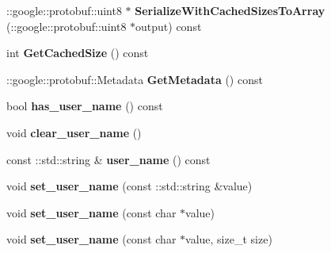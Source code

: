 \begin{DoxyCompactItemize}
\item 
\hypertarget{classSimpleChat_1_1ChatTarget_a571dabbabfa13682a417763cf8295430}{\-::google\-::protobuf\-::uint8 $\ast$ {\bfseries Serialize\-With\-Cached\-Sizes\-To\-Array} (\-::google\-::protobuf\-::uint8 $\ast$output) const }\label{classSimpleChat_1_1ChatTarget_a571dabbabfa13682a417763cf8295430}

\item 
\hypertarget{classSimpleChat_1_1ChatTarget_ae7f5a171f96de9e6f48a5d066160b3af}{int {\bfseries Get\-Cached\-Size} () const }\label{classSimpleChat_1_1ChatTarget_ae7f5a171f96de9e6f48a5d066160b3af}

\item 
\hypertarget{classSimpleChat_1_1ChatTarget_aff7a0f604becdbd2c8c431741f38f48e}{\-::google\-::protobuf\-::\-Metadata {\bfseries Get\-Metadata} () const }\label{classSimpleChat_1_1ChatTarget_aff7a0f604becdbd2c8c431741f38f48e}

\item 
\hypertarget{classSimpleChat_1_1ChatTarget_a66e0bc40c78d2b66c9fb9afbf2c5953e}{bool {\bfseries has\-\_\-user\-\_\-name} () const }\label{classSimpleChat_1_1ChatTarget_a66e0bc40c78d2b66c9fb9afbf2c5953e}

\item 
\hypertarget{classSimpleChat_1_1ChatTarget_aabc592535549d57aeb35790ba8a082aa}{void {\bfseries clear\-\_\-user\-\_\-name} ()}\label{classSimpleChat_1_1ChatTarget_aabc592535549d57aeb35790ba8a082aa}

\item 
\hypertarget{classSimpleChat_1_1ChatTarget_a0e7fecd185ef684d2a11bbd0d40288f4}{const \-::std\-::string \& {\bfseries user\-\_\-name} () const }\label{classSimpleChat_1_1ChatTarget_a0e7fecd185ef684d2a11bbd0d40288f4}

\item 
\hypertarget{classSimpleChat_1_1ChatTarget_ae0dfb8025905103704facea22ff305fd}{void {\bfseries set\-\_\-user\-\_\-name} (const \-::std\-::string \&value)}\label{classSimpleChat_1_1ChatTarget_ae0dfb8025905103704facea22ff305fd}

\item 
\hypertarget{classSimpleChat_1_1ChatTarget_a1853ab22e4f8153ceca6e764c9b2b3bc}{void {\bfseries set\-\_\-user\-\_\-name} (const char $\ast$value)}\label{classSimpleChat_1_1ChatTarget_a1853ab22e4f8153ceca6e764c9b2b3bc}

\item 
\hypertarget{classSimpleChat_1_1ChatTarget_a3d3431afad65e465a73cff3bc9b466fb}{void {\bfseries set\-\_\-user\-\_\-name} (const char $\ast$value, size\-\_\-t size)}\label{classSimpleChat_1_1ChatTarget_a3d3431afad65e465a73cff3bc9b466fb}


\end{DoxyCompactItemize}
